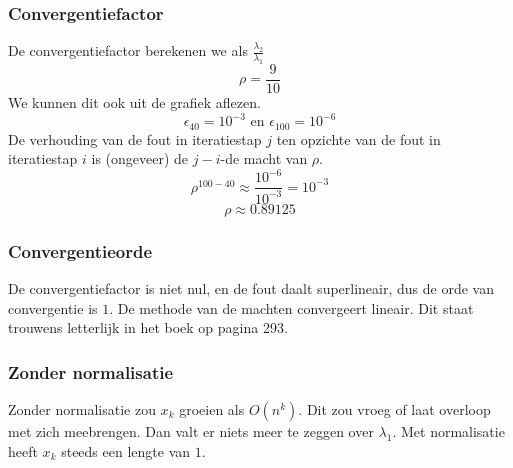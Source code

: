 \documentclass[examenvragen.tex]{subfiles}
\begin{document}
\subsubsection{Convergentiefactor}
De convergentiefactor berekenen we als $\frac{\lambda_{2}}{\lambda_{1}}$
\[
\rho = \frac{9}{10}
\]
We kunnen dit ook uit de grafiek aflezen.
\[
\epsilon_{40} = 10^{-3} \text{ en } \epsilon_{100} = 10^{-6}
\]
De verhouding van de fout in iteratiestap $j$ ten opzichte van de fout in iteratiestap $i$ is (ongeveer) de $j-i$-de macht van $\rho$.
\[
\rho^{100-40} \approx \frac{10^{-6}}{10^{-3}} = 10^{-3}
\]
\[
\rho \approx 0.89125
\]
\subsubsection{Convergentieorde}
De convergentiefactor is niet nul, en de fout daalt superlineair, dus de orde van convergentie is $1$. De methode van de machten convergeert lineair. Dit staat trouwens letterlijk in het boek op pagina 293.

\subsubsection{Zonder normalisatie}
Zonder normalisatie zou $x_{k}$ groeien als $O(n^{k})$. Dit zou vroeg of laat overloop met zich meebrengen. Dan valt er niets meer te zeggen over $\lambda_{1}$. Met normalisatie heeft $x_{k}$ steeds een lengte van $1$.



\end{document}
